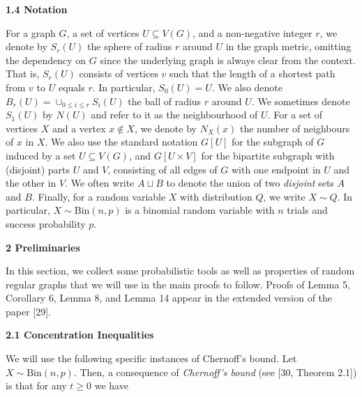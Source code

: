 \documentclass[10pt,a4paper]{article}
\begin{document}
\par\medskip\noindent\textbf{
1.4 Notation}\par




For a graph $G$, a set of vertices $U\subseteq V(G)$, and a non-negative integer $r$, we denote by $S_{r}(U)$ the sphere of radius $r$ around $U$ in the graph metric, omitting the dependency on $G$ since the underlying graph is always clear from the context. That is, $S_{r}(U)$ consists of vertices $v$ such that the length of a shortest path from $v$ to $U$ equals $r$. In particular, $S_{0}(U)=U$. We also denote $B_{r}(U)=\cup_{0\leq i\leq r}S_{i}(U)$ the ball of radius $r$ around $U$. We sometimes denote $S_{1}(U)$ by $N(U)$ and refer to it as the neighbourhood of $U$. For a set of vertices $X$ and a vertex $x\notin X$, we denote by $N_{X}(x)$ the number of neighbours of $x$ in $X$. We also use the standard notation $G[U]$ for the subgraph of $G$ induced by a set $U\subseteq V(G)$, and $G[U\times V]$ for the bipartite subgraph with (disjoint) parts $U$ and $V$, consisting of all edges of $G$ with one endpoint in $U$ and the other in $V$. We often write $A\sqcup B$ to denote the union of two \emph{disjoint} sets $A$ and $B$. Finally, for a random variable $X$ with distribution $Q$, we write $X\sim Q$. In particular, $X\sim\mathrm{Bin}(n,p)$ is a binomial random variable with $n$ trials and success probability $p$.\par






\par\medskip\noindent\textbf{
2 Preliminaries}\par




In this section, we collect some probabilistic tools as well as properties of random regular graphs that we will use in the main proofs to follow. Proofs of Lemma 5, Corollary 6, Lemma 8, and Lemma 14 appear in the extended version of the paper [29].\par




\par\medskip\noindent\textbf{
2.1 Concentration Inequalities}\par




We will use the following specific instances of Chernoff’s bound. Let $X\sim\textrm{Bin}(n,p)$. Then, a consequence of \emph{Chernoff’s bound} (see [30, Theorem 2.1]) is that for any $t\geq 0$ we have\par
\end{document}
